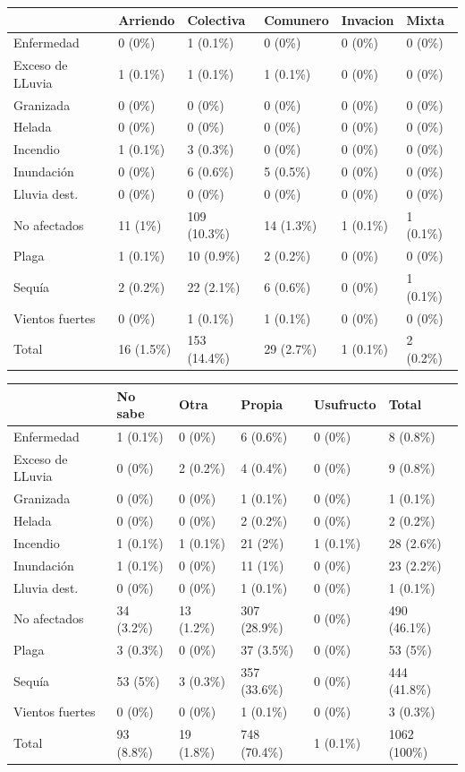 \documentclass[]{tufte-handout}
\begin{document}
\begin{tabular}{llllll}
\toprule
  & Arriendo & Colectiva & Comunero & Invacion & Mixta\\
\midrule
Enfermedad & 0 (0\%) & 1 (0.1\%) & 0 (0\%) & 0 (0\%) & 0 (0\%)\\
Exceso de LLuvia & 1 (0.1\%) & 1 (0.1\%) & 1 (0.1\%) & 0 (0\%) & 0 (0\%)\\
Granizada & 0 (0\%) & 0 (0\%) & 0 (0\%) & 0 (0\%) & 0 (0\%)\\
Helada & 0 (0\%) & 0 (0\%) & 0 (0\%) & 0 (0\%) & 0 (0\%)\\
Incendio & 1 (0.1\%) & 3 (0.3\%) & 0 (0\%) & 0 (0\%) & 0 (0\%)\\
\addlinespace
Inundación & 0 (0\%) & 6 (0.6\%) & 5 (0.5\%) & 0 (0\%) & 0 (0\%)\\
Lluvia dest. & 0 (0\%) & 0 (0\%) & 0 (0\%) & 0 (0\%) & 0 (0\%)\\
No afectados & 11 (1\%) & 109 (10.3\%) & 14 (1.3\%) & 1 (0.1\%) & 1 (0.1\%)\\
Plaga & 1 (0.1\%) & 10 (0.9\%) & 2 (0.2\%) & 0 (0\%) & 0 (0\%)\\
Sequía & 2 (0.2\%) & 22 (2.1\%) & 6 (0.6\%) & 0 (0\%) & 1 (0.1\%)\\
\addlinespace
Vientos fuertes & 0 (0\%) & 1 (0.1\%) & 1 (0.1\%) & 0 (0\%) & 0 (0\%)\\
Total & 16 (1.5\%) & 153 (14.4\%) & 29 (2.7\%) & 1 (0.1\%) & 2 (0.2\%)\\
\bottomrule
\end{tabular}
\newpage
\vspace{0.7cm}

\begin{tabular}{llllll}
\toprule
  & No sabe & Otra & Propia & Usufructo & Total\\
\midrule
Enfermedad & 1 (0.1\%) & 0 (0\%) & 6 (0.6\%) & 0 (0\%) & 8 (0.8\%)\\
Exceso de LLuvia & 0 (0\%) & 2 (0.2\%) & 4 (0.4\%) & 0 (0\%) & 9 (0.8\%)\\
Granizada & 0 (0\%) & 0 (0\%) & 1 (0.1\%) & 0 (0\%) & 1 (0.1\%)\\
Helada & 0 (0\%) & 0 (0\%) & 2 (0.2\%) & 0 (0\%) & 2 (0.2\%)\\
Incendio & 1 (0.1\%) & 1 (0.1\%) & 21 (2\%) & 1 (0.1\%) & 28 (2.6\%)\\
\addlinespace
Inundación & 1 (0.1\%) & 0 (0\%) & 11 (1\%) & 0 (0\%) & 23 (2.2\%)\\
Lluvia dest. & 0 (0\%) & 0 (0\%) & 1 (0.1\%) & 0 (0\%) & 1 (0.1\%)\\
No afectados & 34 (3.2\%) & 13 (1.2\%) & 307 (28.9\%) & 0 (0\%) & 490 (46.1\%)\\
Plaga & 3 (0.3\%) & 0 (0\%) & 37 (3.5\%) & 0 (0\%) & 53 (5\%)\\
Sequía & 53 (5\%) & 3 (0.3\%) & 357 (33.6\%) & 0 (0\%) & 444 (41.8\%)\\
\addlinespace
Vientos fuertes & 0 (0\%) & 0 (0\%) & 1 (0.1\%) & 0 (0\%) & 3 (0.3\%)\\
Total & 93 (8.8\%) & 19 (1.8\%) & 748 (70.4\%) & 1 (0.1\%) & 1062 (100\%)\\
\bottomrule
\end{tabular}
\vspace{0.7 cm}
\end{document}
